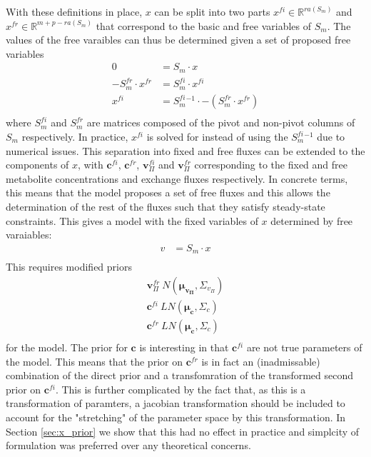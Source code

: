 \documentclass[10pt,letterpaper]{article}
\newcommand{\dgf}{\Delta_fG}
\newcommand{\bdgf}{\mathbf{\dgf}}
\newcommand{\bc}{\mathbf{c}}
\newcommand{\bv}{\mathbf{v}}
\begin{document}
With these definitions in place, $x$ can be split into two parts $x^{fi} \in \mathbb{R}^{ra(S_m)}$ and $x^{fr}\in \mathbb{R}^{m+p-ra(S_m)}$ that correspond to the basic and free variables of $S_m$.
The values of the free varaibles can thus be determined given a set of proposed free variables
\begin{align}
    0 &= S_m\cdot x\\
    -S_m^{fr}\cdot x^{fr} &= S_m^{fi}\cdot  x^{fi}\\
    x^{fi} &= S_m^{fi}^{-1} \cdot -(S_m^{fr}\cdot x^{fr})\\
\end{align}
where $S_m^{fi}$ and $S_m^{fr}$ are matrices composed of the pivot and non-pivot columns of $S_m$ respectively.
In practice, $x^{fi}$ is solved for instead of using the $S_m^{fi}^{-1}$ due to numerical issues.
This separation into fixed and free fluxes can be extended to the components of $x$, with $\bc^{fi}$, $\bc^{fr}$, $\bv_\Pi^{fi}$ and $\bv_\Pi^{fr}$ corresponding to the fixed and free metabolite concentrations and exchange fluxes respectively.
In concrete terms, this means that the model proposes a set of free fluxes and this allows the determination of the rest of the fluxes such that they satisfy steady-state constraints.
This gives a model with the fixed variables of $x$ determined by free varaiables:
\begin{align}
    v &= S_m\cdot x\\
\end{align}
This requires modified priors
\begin{align}
    \bv_\Pi^{fr} ~ N(\mathbf{\mu_{v_{\Pi}}}, \Sigma_{v_{\Pi}}) \\
    \bc^{fi} ~ LN(\mathbf{\mu_c}, \Sigma_c) \\
    \bc^{fr} ~ LN(\mathbf{\mu_c}, \Sigma_c) \\
\end{align}
for the model.
The prior for $\bc$ is interesting in that $\bc^{fi}$ are not true parameters of the model.
This means that the prior on $\bc^{fr}$ is in fact an (inadmissable) combination of the direct prior and a transfomration of the transformed second prior on $\bc^{fi}$.
This is further complicated by the fact that, as this is a transformation of paramters, a jacobian transformation should be included to account for the "stretching" of the parameter space by this transformation.
In Section \ref{sec:x_prior} we show that this had no effect in practice and simplcity of formulation was preferred over any theoretical concerns.
\end{document}
